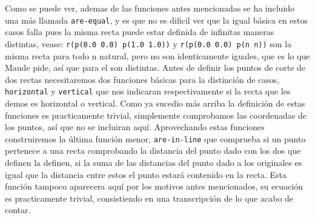 Como se puede ver, ademas de las funciones antes mencionadas se ha incluido una más llamada \texttt{are-equal}, y es que no es dificil ver que la igual básica en estos casos falla pues la misma recta puede estar definida de infinitas maneras distintas, vease: \texttt{r(p(0.0 0.0) p(1.0 1.0))} y \texttt{r(p(0.0 0.0) p(n n))} son la misma recta para todo n natural, pero no son identicamente iguales, que es lo que Maude pide, así que para el son distintas. Antes de definir los puntos de corte de dos rectas necesitaremos dos funciones básicas para la distinción de casos, \texttt{horizontal} y \texttt{vertical} que nos indicaran respectivamente si la recta que les demos es horizontal o vertical. Como ya sucedio más arriba la definición de estas funciones es practicamente trivial, simplemente comprobamos las coordenadas de los puntos, así que no se incluiran aquí. Aprovechando estas funciones construiremos la última función menor, \texttt{are-in-line} que comprueba si un punto pertenece a una recta comprobando la distancia del punto dado con los dos que definen la definen, si la suma de las distancias del punto dado a los originales es igual que la distancia entre estos el punto estará contenido en la recta. Esta función tampoco aparecera aquí por los motivos antes mencionados, su ecuación es practicamente trivial, consistiendo en una transcripción de lo que acabo de contar.\par


